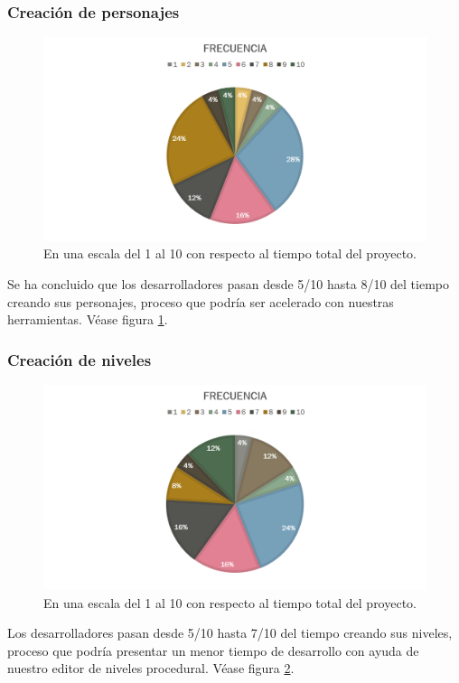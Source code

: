 \documentclass[]{article}
\begin{document}
\subsubsection{Creaci\'on de personajes}
\begin{figure}[H]
	
	\centering
	\includegraphics[width=1\textwidth]{Encuesta_tiempo_personajes}
	\caption{En una escala del 1 al 10 con respecto al tiempo total del proyecto.} 
	\label{PERSONAJES}
	
\end{figure}
Se ha concluido que los desarrolladores pasan desde 5/10 hasta 8/10 del tiempo creando sus personajes, proceso que podr\'ia ser acelerado con nuestras herramientas. V\'ease figura \ref{PERSONAJES}.

\subsubsection{Creaci\'on de niveles}
\begin{figure}[H]
	
	\centering
	\includegraphics[width=1\textwidth]{Encuesta_tiempo_niveles}
	\caption{En una escala del 1 al 10 con respecto al tiempo total del proyecto.} 
	\label{NIVELES}
	
\end{figure}
Los desarrolladores pasan desde 5/10 hasta 7/10 del tiempo creando sus niveles, proceso que podr\'ia presentar un menor tiempo de desarrollo con ayuda de nuestro editor de niveles procedural. V\'ease figura \ref{NIVELES}.
\end{document}
